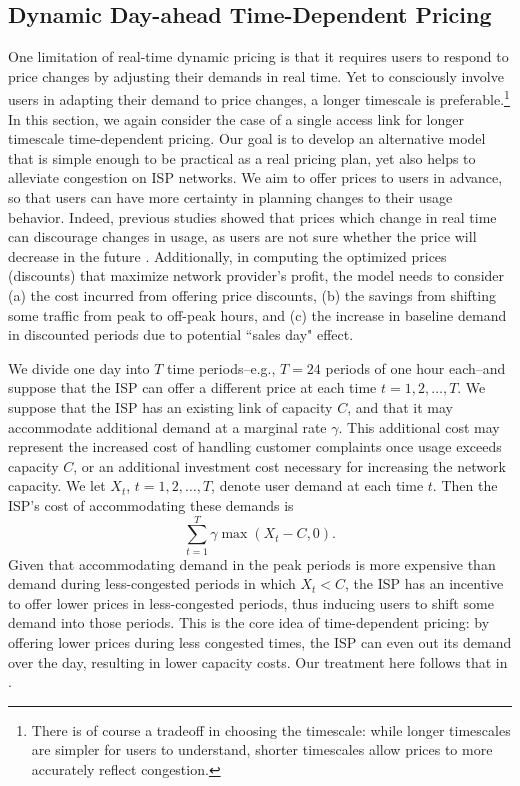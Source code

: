 \subsection{Dynamic Day-ahead Time-Dependent Pricing}\label{sec:dayahead}

One limitation of real-time dynamic pricing is that it requires users to respond to price changes by adjusting their demands in real time. Yet to consciously involve users in adapting their demand to price changes, a longer timescale is preferable.\footnote{There is of course a tradeoff in choosing the timescale: while longer timescales are simpler for users to understand, shorter timescales allow prices to more accurately reflect congestion.} In this section, we again consider the case of a single access link for longer timescale time-dependent pricing. Our goal is to develop an alternative model that is simple enough to be practical as a real pricing plan, yet also helps to alleviate congestion on ISP networks. We aim to offer prices to users in advance, so that users can have more certainty in planning changes to their usage behavior. Indeed, previous studies showed that prices which change in real time can discourage changes in usage, as users are not sure whether the price will decrease in the future \cite{shih2001pricing}. Additionally, in computing the optimized prices (discounts) that maximize network provider's profit, the model needs to consider (a) the cost incurred from offering price discounts, (b) the savings from shifting some traffic from peak to off-peak hours, and (c) the increase in baseline demand in discounted periods due to potential ``sales day" effect.

We divide one day into $T$ time periods--e.g., $T = 24$ periods of one hour each--and suppose that the ISP can offer a different price at each time $t = 1,2,\ldots,T$. We suppose that the ISP has an existing link of capacity $C$, and that it may accommodate additional demand at a marginal rate $\gamma$. This additional cost may represent the increased cost of handling customer complaints once usage exceeds capacity $C$, or an additional investment cost necessary for increasing the network capacity. We let $X_t$, $t = 1,2,\ldots,T$, denote user demand at each time $t$. Then the ISP's cost of accommodating these demands is
\begin{equation}
\sum_{t = 1}^T \gamma\max\left(X_t - C, 0\right).
\label{eq:capacity}
\end{equation}
Given that accommodating demand in the peak periods is more expensive than demand during less-congested periods in which $X_t < C$, the ISP has an incentive to offer lower prices in less-congested periods, thus inducing users to shift some demand into those periods. This is the core idea of time-dependent pricing: by offering lower prices during less congested times, the ISP can even out its demand over the day, resulting in lower capacity costs. Our treatment here follows that in \cite{ha2012tube}.

